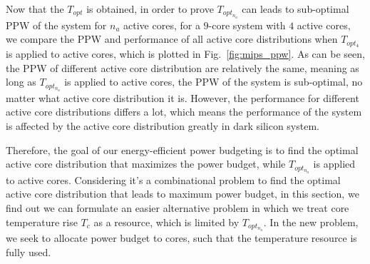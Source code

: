 Now that the $T_{opt}$ is obtained, in order to prove $T_{opt_{n_{a}}}$ can leads to sub-optimal PPW of the system for $n_{a}$ active cores, for a $9$-core system with $4$ active cores, we compare the PPW and performance of all active core distributions when $T_{opt_{4}}$ is applied to active cores, which is plotted in Fig.~\ref{fig:mips_ppw}. As can be seen, the PPW of different active core distribution are relatively the same, meaning as long as $T_{opt_{n_{a}}}$ is applied to active cores, the PPW of the system is sub-optimal, no matter what active core distribution it is. However, the performance for different active core distributions differs a lot, which means the performance of the system is affected by the active core distribution greatly in dark silicon system.

Therefore, the goal of our energy-efficient power budgeting is to find the optimal active core distribution that maximizes the power budget, while $T_{opt_{n_{a}}}$ is applied to active cores. Considering it's a combinational problem to find the optimal active core distribution that leads to maximum power budget, in this section, we find out we can formulate an easier alternative problem in which we treat core temperature rise $T_{c}$ as a resource, which is limited by $T_{opt_{n_{a}}}$. In the new problem, we seek to allocate power budget to cores, such that the temperature resource is fully used.

